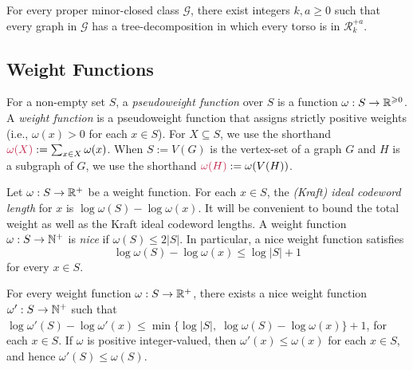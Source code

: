 \documentclass{patmorin}
\makeatletter
\renewcommand{\ge}{\geqslant}
\renewcommand{\le}{\leqslant}
\renewcommand{\geq}{\geqslant}
\renewcommand{\leq}{\leqslant}
\newcommand{\defin}[1]{\emph{\textcolor{brightmaroon}{#1}}}
\def\mathcolor#1#{\@mathcolor{#1}}
\def\@mathcolor#1#2#3{%
  \protect\leavevmode
  \begingroup
    \color#1{#2}#3%
  \endgroup
}
\newcommand{\mathdefin}[1]{\mathcolor{brightmaroon}{#1}}
\newcommand{\calG}{\mathcal{G}}
\newcommand{\calR}{\mathcal{R}}
\makeatother
\begin{document}


\begin{thm}
  \label{gmpst}
  For every proper minor-closed class $\calG$, there exist integers $k,a\geq 0$ such that every graph in $\calG$ has a tree-decomposition in which every torso is in $\calR_k^{+a}$.
\end{thm}





\subsection{Weight Functions}

For a non-empty set $S$, a \defin{pseudoweight function} over $S$ is a function $\omega:S\to\R^{\ge 0}$.  A \defin{weight function} is a pseudoweight function that assigns strictly positive weights (i.e., $\omega(x)>0$ for each $x\in S$).  For $X\subseteq S$, we use the shorthand $\mathdefin{\omega(X)}:=\sum_{x\in X}\omega(x)$.  When $S:=V(G)$ is the vertex-set of a graph $G$ and $H$ is a subgraph of $G$, we use the shorthand $\mathdefin{\omega(H)}:=\omega(V(H))$.

Let $\omega:S\to\mathbb{R}^+$ be a weight function.  For each $x\in S$, the \defin{(Kraft) ideal codeword length} for $x$ is $\log\omega(S)-\log\omega(x)$.
It will be convenient to bound the total weight as well as the Kraft ideal codeword lengths. A weight function $\omega:S\to\mathbb{N}^+$ is \defin{nice} if $\omega(S)\le 2|S|$. In particular, a nice weight function satisfies
\[
  \log\omega(S)-\log\omega(x)\le\log|S|+1
\]
for every $x\in S$.

\begin{obs}\label{obs:nice}
  For every weight function $\omega:S\to\mathbb{R}^+$, there exists a nice weight function $\omega':S\to\mathbb{N}^+$ such that $\log\omega'(S)-\log\omega'(x)\le\min\{\log|S|,\;\log\omega(S)-\log\omega(x)\}+1$, for each $x\in S$. If $\omega$ is positive integer-valued, then $\omega'(x)\le\omega(x)$ for each $x\in S$, and hence $\omega'(S)\le\omega(S)$.
\end{obs}
\end{document}
